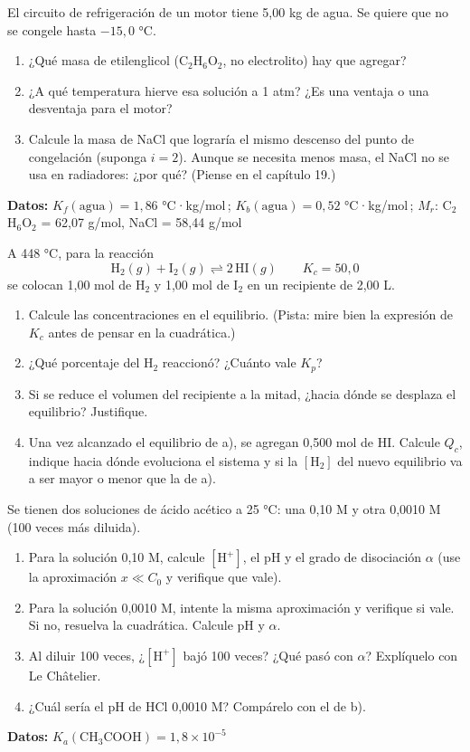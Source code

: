 \documentclass[11pt]{article}
\newcommand{\ejercicio}[1]{\par\vspace{10pt}{\large\bfseries\color{NavyBlue}Ejercicio #1}\par
  \nointerlineskip\vspace{2pt}{\color{NavyBlue!40}\rule{\linewidth}{0.4pt}}\par\vspace{2pt}}
\begin{document}
\ejercicio{3}
El circuito de refrigeración de un motor tiene 5,00 kg de agua. Se quiere que no se congele hasta \(-15{,}0\) °C.
\begin{enumerate}
\item ¿Qué masa de etilenglicol (C\(_2\)H\(_6\)O\(_2\), no electrolito) hay que agregar?
\item ¿A qué temperatura hierve esa solución a 1 atm? ¿Es una ventaja o una desventaja para el motor?
\item Calcule la masa de NaCl que lograría el mismo descenso del punto de congelación (suponga \(i = 2\)). Aunque se necesita menos masa, el NaCl no se usa en radiadores: ¿por qué? (Piense en el capítulo 19.)
\end{enumerate}
\begin{datos}
\textbf{Datos:} \(K_f(\text{agua}) = 1{,}86\) °C·kg/mol\,; \(K_b(\text{agua}) = 0{,}52\) °C·kg/mol\,; \(M_r\): C\(_2\)H\(_6\)O\(_2\) = 62,07 g/mol, NaCl = 58,44 g/mol
\end{datos}

\newpage
\ejercicio{4}
A 448 °C, para la reacción
\[\text{H}_2(g) + \text{I}_2(g) \rightleftharpoons 2\,\text{HI}(g) \qquad K_c = 50{,}0\]
se colocan 1,00 mol de H\(_2\) y 1,00 mol de I\(_2\) en un recipiente de 2,00 L.
\begin{enumerate}
\item Calcule las concentraciones en el equilibrio. (Pista: mire bien la expresión de \(K_c\) antes de pensar en la cuadrática.)
\item ¿Qué porcentaje del H\(_2\) reaccionó? ¿Cuánto vale \(K_p\)?
\item Si se reduce el volumen del recipiente a la mitad, ¿hacia dónde se desplaza el equilibrio? Justifique.
\item Una vez alcanzado el equilibrio de a), se agregan 0,500 mol de HI. Calcule \(Q_c\), indique hacia dónde evoluciona el sistema y si la \([\text{H}_2]\) del nuevo equilibrio va a ser mayor o menor que la de a).
\end{enumerate}

\ejercicio{5}
Se tienen dos soluciones de ácido acético a 25 °C: una 0,10 M y otra 0,0010 M (100 veces más diluida).
\begin{enumerate}
\item Para la solución 0,10 M, calcule \([\text{H}^+]\), el pH y el grado de disociación \(\alpha\) (use la aproximación \(x \ll C_0\) y verifique que vale).
\item Para la solución 0,0010 M, intente la misma aproximación y verifique si vale. Si no, resuelva la cuadrática. Calcule pH y \(\alpha\).
\item Al diluir 100 veces, ¿\([\text{H}^+]\) bajó 100 veces? ¿Qué pasó con \(\alpha\)? Explíquelo con Le Châtelier.
\item ¿Cuál sería el pH de HCl 0,0010 M? Compárelo con el de b).
\end{enumerate}
\begin{datos}
\textbf{Datos:} \(K_a(\text{CH}_3\text{COOH}) = 1{,}8\times10^{-5}\)
\end{datos}
\end{document}
